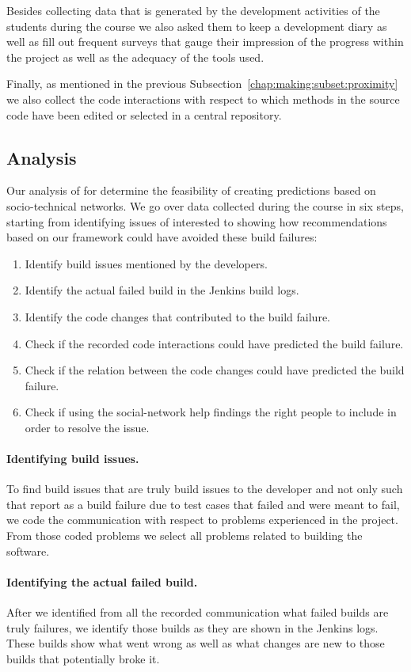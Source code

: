 Besides collecting data that is generated by the development activities of the students during the course we also asked them to keep a development diary as well as fill out frequent surveys that gauge their impression of the progress within the project as well as the adequacy of the tools used.

Finally, as mentioned in the previous Subsection~\ref{chap:making:subset:proximity} we also collect the code interactions with respect to which methods in the source code have been edited or selected in a central repository.

\subsection{Analysis}
Our analysis of for determine the feasibility of creating predictions based on socio-technical networks.
We go over data collected during the course in six steps, starting from identifying issues of interested to showing how recommendations based on our framework could have avoided these build failures:

\begin{enumerate}
\item Identify build issues mentioned by the developers.
\item Identify the actual failed build in the Jenkins build logs.
\item Identify the code changes that contributed to the build failure.
\item Check if the recorded code interactions could have predicted the build failure.
\item Check if the relation between the code changes could have predicted the build failure.
\item Check if using the social-network help findings the right people to include in order to resolve the issue.
\end{enumerate}

\paragraph{Identifying build issues.}
To find build issues that are truly build issues to the developer and not only such that report as a build failure due to test cases that failed and were meant to fail, we code the communication with respect to problems experienced in the project.
From those coded problems we select all problems related to building the software.

\paragraph{Identifying the actual failed build.}
After we identified from all the recorded communication what failed builds are truly failures, we identify those builds as they are shown in the Jenkins logs.
These builds show what went wrong as well as what changes are new to those builds that potentially broke it.

